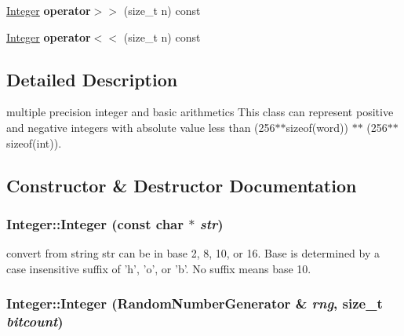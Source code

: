 \begin{DoxyCompactItemize}
\item 
\hypertarget{class_integer_a5d73ebaa15061b4d251c8cdee218ea26}{
\hyperlink{class_integer}{Integer} {\bfseries operator$>$$>$} (size\_\-t n) const }
\label{class_integer_a5d73ebaa15061b4d251c8cdee218ea26}

\item 
\hypertarget{class_integer_ad3ad44e1538d8d1a0eb55a502588026f}{
\hyperlink{class_integer}{Integer} {\bfseries operator$<$$<$} (size\_\-t n) const }
\label{class_integer_ad3ad44e1538d8d1a0eb55a502588026f}

\end{DoxyCompactItemize}


\subsection{Detailed Description}
multiple precision integer and basic arithmetics This class can represent positive and negative integers with absolute value less than (256$\ast$$\ast$sizeof(word)) $\ast$$\ast$ (256$\ast$$\ast$sizeof(int)). 

\subsection{Constructor \& Destructor Documentation}
\hypertarget{class_integer_a9e8bf8c72458dff4ceb5d6cdf9e5c97a}{
\subsubsection[{Integer}]{\setlength{\rightskip}{0pt plus 5cm}Integer::Integer (const char $\ast$ {\em str})}}
\label{class_integer_a9e8bf8c72458dff4ceb5d6cdf9e5c97a}


convert from string str can be in base 2, 8, 10, or 16. Base is determined by a case insensitive suffix of 'h', 'o', or 'b'. No suffix means base 10. \hypertarget{class_integer_aeb4abb834e9e897a28850d2081f3fa63}{
\subsubsection[{Integer}]{\setlength{\rightskip}{0pt plus 5cm}Integer::Integer ({\bf RandomNumberGenerator} \& {\em rng}, \/  size\_\-t {\em bitcount})}}
\label{class_integer_aeb4abb834e9e897a28850d2081f3fa63}


